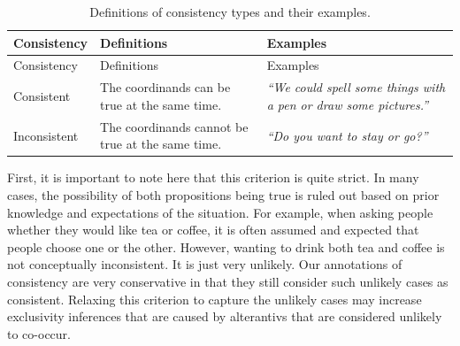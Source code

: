 \documentclass[oneside]{report}
\theoremstyle{definition}
\theoremstyle{definition}
\theoremstyle{definition}
\theoremstyle{remark}
\begin{document}
\begin{longtable}[]{@{}lll@{}}
\caption{\label{tab:consistencyType} Definitions of consistency types and
their examples.}\tabularnewline
\toprule
\begin{minipage}[b]{0.14\columnwidth}\raggedright\strut
Consistency\strut
\end{minipage} & \begin{minipage}[b]{0.25\columnwidth}\raggedright\strut
Definitions\strut
\end{minipage} & \begin{minipage}[b]{0.42\columnwidth}\raggedright\strut
Examples\strut
\end{minipage}\tabularnewline
\midrule
\endfirsthead
\toprule
\begin{minipage}[b]{0.14\columnwidth}\raggedright\strut
Consistency\strut
\end{minipage} & \begin{minipage}[b]{0.25\columnwidth}\raggedright\strut
Definitions\strut
\end{minipage} & \begin{minipage}[b]{0.42\columnwidth}\raggedright\strut
Examples\strut
\end{minipage}\tabularnewline
\midrule
\endhead
\begin{minipage}[t]{0.14\columnwidth}\raggedright\strut
Consistent\strut
\end{minipage} & \begin{minipage}[t]{0.25\columnwidth}\raggedright\strut
The coordinands can be true at the same time.\strut
\end{minipage} & \begin{minipage}[t]{0.42\columnwidth}\raggedright\strut
\emph{``We could spell some things with a pen or draw some
pictures.''}\strut
\end{minipage}\tabularnewline
\begin{minipage}[t]{0.14\columnwidth}\raggedright\strut
Inconsistent\strut
\end{minipage} & \begin{minipage}[t]{0.25\columnwidth}\raggedright\strut
The coordinands cannot be true at the same time.\strut
\end{minipage} & \begin{minipage}[t]{0.42\columnwidth}\raggedright\strut
\emph{``Do you want to stay or go?''}\strut
\end{minipage}\tabularnewline
\bottomrule
\end{longtable}
First, it is important to note here that this criterion is quite strict.
In many cases, the possibility of both propositions being true is ruled
out based on prior knowledge and expectations of the situation. For
example, when asking people whether they would like tea or coffee, it is
often assumed and expected that people choose one or the other. However,
wanting to drink both tea and coffee is not conceptually inconsistent.
It is just very unlikely. Our annotations of consistency are very
conservative in that they still consider such unlikely cases as
consistent. Relaxing this criterion to capture the unlikely cases may
increase exclusivity inferences that are caused by alterantivs that are
considered unlikely to co-occur.
\end{document}
